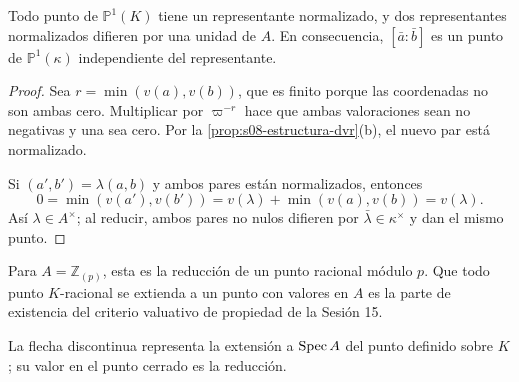\begin{lema}
\label{lema:s08-reduccion-bien-definida}
\label{obs:s08-reduccion-bien-definida}
Todo punto de $\mathbb P^1(K)$ tiene un representante normalizado, y dos representantes normalizados difieren por una unidad de $A$. En consecuencia, $[\bar a:\bar b]$ es un punto de $\mathbb P^1(\kappa)$ independiente del representante.
\end{lema}
\begin{proof}
Sea $r=\min(v(a),v(b))$, que es finito porque las coordenadas no son ambas cero. Multiplicar por $\varpi^{-r}$ hace que ambas valoraciones sean no negativas y una sea cero. Por la \cref{prop:s08-estructura-dvr}(b), el nuevo par está normalizado.

Si $(a',b')=\lambda(a,b)$ y ambos pares están normalizados, entonces
\[
0=\min(v(a'),v(b'))=v(\lambda)+\min(v(a),v(b))=v(\lambda).
\]
Así $\lambda\in A^\times$; al reducir, ambos pares no nulos difieren por $\bar\lambda\in\kappa^\times$ y dan el mismo punto.
\end{proof}

Para $A=\mathbb Z_{(p)}$, esta es la reducción de un punto racional módulo $p$. Que todo punto $K$-racional se extienda a un punto con valores en $A$ es la parte de existencia del criterio valuativo de propiedad de la Sesión 15.

\begin{center}
\end{center}
La flecha discontinua representa la extensión a $\operatorname{Spec} A$ del punto definido sobre $K$; su valor en el punto cerrado es la reducción.

